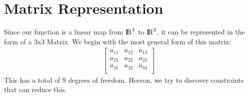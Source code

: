 \documentclass[
11pt, %
english, %
singlespacing, %
headsepline, %
]{MastersDoctoralThesis} %
\begin{document}
\section{Matrix Representation}
Since our function is a linear map from ${\rm I\!R}^3$ to ${\rm I\!R}^3$, it can be represented in the form of a 3x3 Matrix. We begin with the most general form of this matrix:
\begin{align*}
\begin{bmatrix} 
a_{11} & a_{12} & a_{13} \\
a_{21} & a_{22} & a_{23} \\
a_{31} & a_{32} & a_{33} \\
\end{bmatrix}
\end{align*}
This has a total of 9 degrees of freedom. Hereon, we try to discover constraints that can reduce this.
\end{document}
